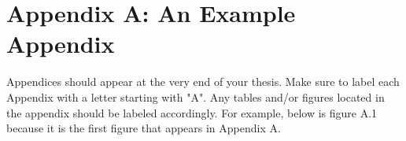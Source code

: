 
\chapter{Appendix A: An Example Appendix}%

\renewcommand{\thechapter}{A} %

Appendices should appear at the very end of your thesis. Make sure to label each Appendix with a letter starting with "A". Any tables and/or figures located in the appendix should be labeled accordingly. For example, below is figure A.1 because it is the first figure that appears in Appendix A.

